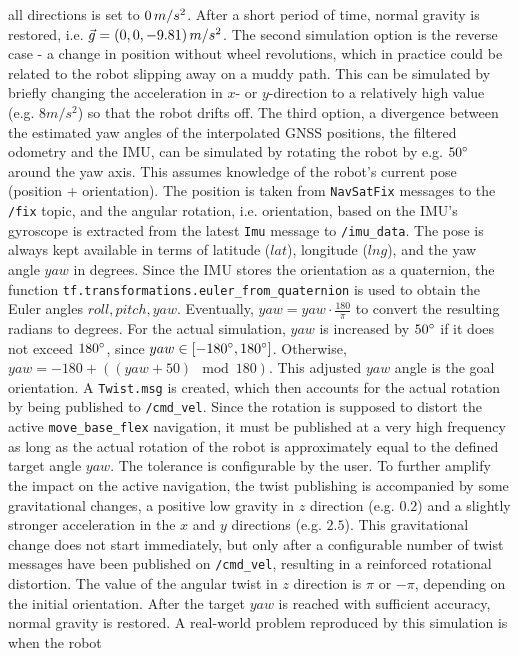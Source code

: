 \documentclass[english, master, utf8]{base/thesis_KBS}
\newcommand{\code}[1]{\colorbox{light-gray}{\texttt{#1}}}
\begin{document}
all directions is set to $0 \thinspace m/s^2$. After a short period of time, normal gravity is restored, i.e. $\vec{g} = (0, 0, -9.81) \thinspace m/s^2$. The second simulation option
is the reverse case - a change in position without wheel revolutions, which in practice could be related to the robot slipping away on a muddy path. This can be simulated by briefly
changing the acceleration in $x$- or $y$-direction to a relatively high value (e.g. $8 m/s^2$) so that the robot drifts off. 
The third option, a divergence between the estimated yaw angles of the interpolated GNSS positions, the filtered odometry and the IMU, can be simulated by rotating the robot by e.g.
$50\degree$ around the yaw axis. This assumes knowledge of the robot's current pose (position + orientation). The position is taken from \code{NavSatFix} messages to the \code{/fix}
topic, and the angular rotation, i.e. orientation, based on the IMU's gyroscope is extracted from the latest \code{Imu} message to \code{/imu\_data}.
The pose is always kept available in terms of latitude ($lat$), longitude ($lng$), and the yaw angle $yaw$ in degrees. Since the IMU stores
the orientation as a quaternion, the function \code{tf.transformations.euler\_from\_quaternion} is used to obtain the Euler angles $roll, pitch, yaw$. Eventually,
$yaw = yaw \cdot \frac{180}{\pi}$ to convert the resulting radians to degrees. For the actual simulation, $yaw$ is increased by $50\degree$ if it does not exceed $180\degree$,
since $yaw \in [-180\degree, 180\degree]$. Otherwise, $yaw = -180 + ((yaw + 50) \mod 180)$. This adjusted $yaw$ angle is the goal orientation. A \code{Twist.msg} is created,
which then accounts for the actual rotation by being published to \code{/cmd\_vel}. Since the rotation is supposed to distort the active \code{move\_base\_flex} navigation, it must
be published at a very high frequency as long as the actual rotation of the robot is approximately equal to the defined target angle $yaw$. The tolerance is configurable by the user.
To further amplify the impact on the active navigation, the twist publishing is accompanied by some gravitational changes, a positive low gravity in $z$ direction (e.g. $0.2$) and
a slightly stronger acceleration in the $x$ and $y$ directions (e.g. $2.5$). This gravitational change does not start immediately, but only after a configurable number of twist
messages have been published on \code{/cmd\_vel}, resulting in a reinforced rotational distortion. The value of the angular twist in $z$ direction is $\pi$ or $-\pi$, depending on
the initial orientation. After the target $yaw$ is reached with sufficient accuracy, normal gravity is restored. A real-world problem reproduced by this simulation is when the robot
\end{document}
